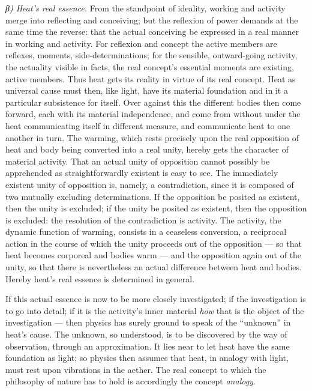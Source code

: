 \documentclass[12pt,a4paper]{book}
\newcommand{\subrunin}[1]{\emph{#1}\hspace{0.4em}}
\begin{document}
\subrunin{β) Heat's real essence.} From the standpoint of ideality, working and activity merge into reflecting and
conceiving; but the reflexion of power demands at the same time the reverse: that the actual conceiving be expressed in a
real manner in working and activity. For reflexion and concept the active members are reflexes, moments,
side-determinations; for the sensible, outward-going activity, the actuality visible in facts, the real concept's
essential moments are existing, active members. Thus heat gets its reality in virtue of its real concept. Heat as
universal cause must then, like light, have its material foundation and in it a particular subsistence for itself. Over
against this the different bodies then come forward, each with its material independence, and come from without under the
heat communicating itself in different measure, and communicate heat to one another in turn. The warming, which rests
precisely upon the real opposition of heat and body being converted into a real unity, hereby gets the character of
material activity. That an actual unity of opposition cannot possibly be apprehended as straightforwardly existent is
easy to see. The immediately existent unity of opposition is, namely, a contradiction, since it is composed of two
mutually excluding determinations. If the opposition be posited as existent, then the unity is excluded; if the unity be
posited as existent, then the opposition is excluded: the resolution of the contradiction is activity. The activity, the
dynamic function of warming, consists in a ceaseless conversion, a reciprocal action in the course of which the unity
proceeds out of the opposition --- so that heat becomes corporeal and bodies warm --- and the opposition again out of the
unity, so that there is nevertheless an actual difference between heat and bodies. Hereby heat's real essence is
determined in general.

If this actual essence is now to be more closely investigated; if the investigation is to go into detail; if it is the
activity's inner material \emph{how} that is the object of the investigation --- then physics has surely ground to speak
of the ``unknown'' in heat's cause. The unknown, so
understood, is to be discovered by the way of observation, through an approximation. It lies near to let heat have the
same foundation as light; so physics then assumes that heat, in analogy with light, must rest upon vibrations in the
aether. The real concept to which the philosophy of nature has to hold is accordingly the concept \emph{analogy}.
\end{document}
